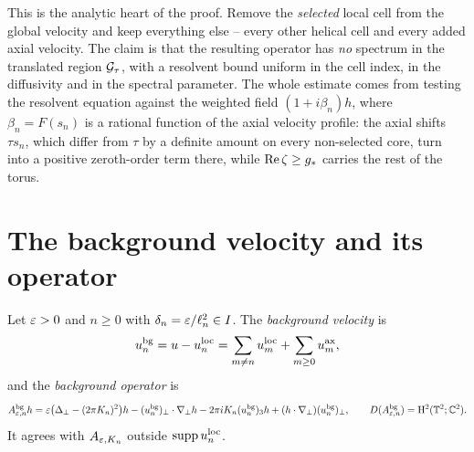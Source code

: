 
This is the analytic heart of the proof.  Remove the \emph{selected} local cell from the
global velocity and keep
everything else -- every other helical cell and every added axial velocity.  The claim is
that the resulting operator has \emph{no} spectrum in the translated region $\mathcal{G}_\tau$, with
a resolvent bound uniform in the cell index, in the diffusivity and in the spectral
parameter.  The whole estimate comes from testing the resolvent equation against the
weighted field $(1+i\beta_n)h$, where $\beta_n=F(s_n)$ is a rational function of the axial
velocity profile: the axial shifts $\tau s_n$, which differ from $\tau$ by a definite
amount on every non-selected core, turn into a positive zeroth-order term there, while
$\operatorname{Re}\zeta\geq g_*$ carries the rest of the torus.

\section{The background velocity and its operator}

\begin{definition}
  \label{def:background:periodic-background}
  \leanok
  Let $\varepsilon>0$ and $n\geq0$ with $\delta_n=\varepsilon/\ell_n^2\in I$.
  The \emph{background velocity} is
  \begin{equation}
    u_n^{\rm bg}=u-u_n^{\rm loc}
      =\sum_{m\neq n}u_m^{\rm loc}+\sum_{m\geq0}u_m^{\rm ax},
    \label{eq:background:velocity}
  \end{equation}
  and the \emph{background operator} is
  \begin{equation}
    A^{\rm bg}_{\varepsilon,n}h=\varepsilon\bigl(\Delta_\perp-(2\pi K_n)^2\bigr)h
      -(u_n^{\rm bg})_\perp\cdot\nabla_\perp h-2\pi iK_n(u_n^{\rm bg})_3h
      +(h\cdot\nabla_\perp)(u_n^{\rm bg})_\perp,
    \qquad D(A^{\rm bg}_{\varepsilon,n})=\mathrm{H}^2(\mathbb{T}^2;\mathbb{C}^2).
    \label{eq:background:operator}
  \end{equation}
  It agrees with $A_{\varepsilon,K_n}$ outside $\operatorname{supp} u_n^{\rm loc}$.
\end{definition}

